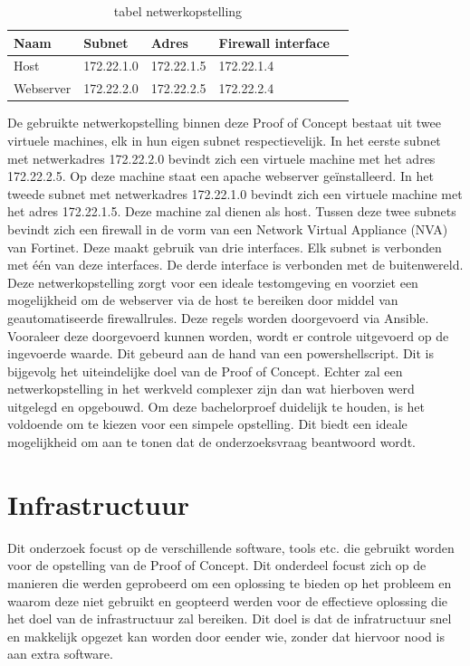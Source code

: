 \begin{table}[h]
\begin{tabular}{|l|l|l|l|l|}
\hline
 \textbf{Naam} & \textbf{Subnet} & \textbf{Adres} & \textbf{Firewall interface} \\ \hline
 Host  & 172.22.1.0  & 172.22.1.5 & 172.22.1.4 \\ \hline
Webserver  & 172.22.2.0  & 172.22.2.5  & 172.22.2.4 \\ \hline
\end{tabular}
\caption{tabel netwerkopstelling}
\label{tab:netwerkopstelling}
\end{table}
\label{sec:Netwerk}
De gebruikte netwerkopstelling binnen deze Proof of Concept bestaat uit twee virtuele machines, elk in hun eigen subnet respectievelijk. In het eerste subnet met netwerkadres 172.22.2.0 bevindt zich een virtuele machine met het adres 172.22.2.5. Op deze machine staat een apache webserver geïnstalleerd. In het tweede subnet met netwerkadres 172.22.1.0 bevindt zich een virtuele machine met het adres 172.22.1.5. Deze machine zal dienen als host. Tussen deze twee subnets bevindt zich een firewall in de vorm van een Network Virtual Appliance (NVA) van Fortinet. Deze maakt gebruik van drie interfaces. Elk subnet is verbonden met één van deze interfaces. De derde interface is verbonden met de buitenwereld. Deze netwerkopstelling zorgt voor een ideale testomgeving en voorziet een mogelijkheid om de webserver via de host te bereiken door middel van geautomatiseerde firewallrules. Deze regels worden doorgevoerd via Ansible. Vooraleer deze doorgevoerd kunnen worden, wordt er controle uitgevoerd op de ingevoerde waarde. Dit gebeurd aan de hand van een powershellscript. Dit is bijgevolg het uiteindelijke doel van de Proof of Concept. Echter zal een netwerkopstelling in het werkveld complexer zijn dan wat hierboven werd uitgelegd en opgebouwd. Om deze bachelorproef duidelijk te houden, is het voldoende om te kiezen voor een simpele opstelling. Dit biedt een ideale mogelijkheid om aan te tonen dat de onderzoeksvraag beantwoord wordt. 


\section{Infrastructuur}
Dit onderzoek focust op de verschillende software, tools etc. die gebruikt worden voor de opstelling van de Proof of Concept. Dit onderdeel focust zich op de manieren die werden geprobeerd om een oplossing te bieden op het probleem en waarom deze niet gebruikt en geopteerd werden voor de effectieve oplossing die het doel van de infrastructuur zal bereiken. Dit doel is dat de infratructuur snel en makkelijk opgezet kan worden door eender wie, zonder dat hiervoor nood is aan extra software.

